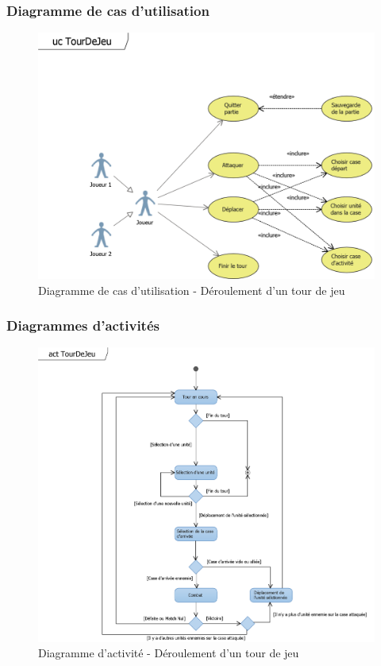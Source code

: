\documentclass[a4paper,11pt]{article}
\begin{document}
\subsubsection{Diagramme de cas d'utilisation}
\begin{figure}[ht!]
\includegraphics{ucTourDeJeu.png}
\caption{Diagramme de cas d'utilisation - Déroulement d'un tour de jeu}
\label{fig:uctour}
\end{figure}
\vspace*{1cm}
\lipsum[1]
\newpage


\subsubsection{Diagrammes d'activités}
\begin{figure}[ht!]
\includegraphics{actTourDeJeu.png}
\caption{Diagramme d'activité - Déroulement d'un tour de jeu}
\label{fig:acttour}
\end{figure}
\vspace*{1cm}
\lipsum[1]
\newpage
\end{document}

